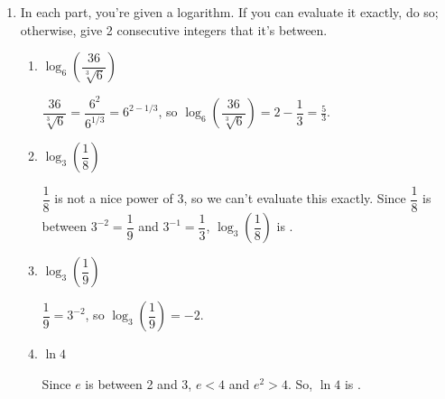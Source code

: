 \documentclass{article}
\theoremstyle{theorem}
\begin{document}
\begin{enumerate}[resume]
\item 

  In each part, you're given a logarithm. If you can evaluate it exactly, do so; otherwise, give 2 consecutive integers that it's between.

  \begin{enumerate}

  \item
    \begin{problem}
      $\log_6 \left( \dfrac{36}{\sqrt[3]{6}} \right)$
    \end{problem}

    \begin{solution}
      $\dfrac{36}{\sqrt[3]{6}} = \dfrac{6^2}{6^{1/3}} = 6^{2 - 1/3}$, so $\log_6 \left( \dfrac{36}{\sqrt[3]{6}} \right) = 2 - \dfrac{1}{3} = \boxed{\frac{5}{3}}$. 
    \end{solution}

  \item
    \begin{problem}
      $\log_3 \left( \dfrac{1}{8} \right)$      
    \end{problem}

    \begin{solution}
      $\dfrac{1}{8}$ is not a nice power of 3, so we can't evaluate this exactly. Since $\dfrac{1}{8}$ is between $3^{-2} = \dfrac{1}{9}$ and $3^{-1} = \dfrac{1}{3}$, $\log_3 \left( \dfrac{1}{8} \right)$ is .
    \end{solution}

  \item
    \begin{problem}
      $\log_3 \left( \dfrac{1}{9} \right)$
    \end{problem}

    \begin{solution}
      $\dfrac{1}{9} = 3^{-2}$, so $\log_3 \left( \dfrac{1}{9} \right) = \boxed{-2}$. 
    \end{solution}

  \item
    \begin{problem}
      $\ln 4$
    \end{problem}

    \begin{solution}
      Since $e$ is between 2 and 3, $e < 4$ and $e^2 > 4$. So, $\ln 4$ is .
    \end{solution}

  \end{enumerate}
\end{enumerate}
\end{document}
